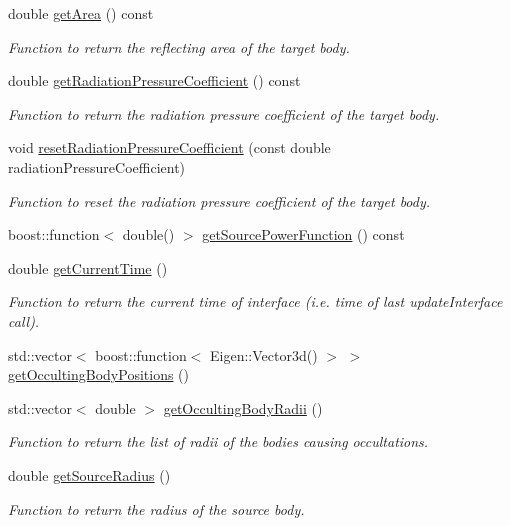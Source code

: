 \begin{DoxyCompactItemize}
double \hyperlink{classtudat_1_1electro__magnetism_1_1RadiationPressureInterface_a5325694fd8405b5645cfe418f6f405ab}{get\+Area} () const 
\begin{DoxyCompactList}\small\item\em Function to return the reflecting area of the target body. \end{DoxyCompactList}\item 
double \hyperlink{classtudat_1_1electro__magnetism_1_1RadiationPressureInterface_aa842d443f73b0af16be5e0642ec4fa57}{get\+Radiation\+Pressure\+Coefficient} () const 
\begin{DoxyCompactList}\small\item\em Function to return the radiation pressure coefficient of the target body. \end{DoxyCompactList}\item 
void \hyperlink{classtudat_1_1electro__magnetism_1_1RadiationPressureInterface_a8677c222996dd15c80037739d643731c}{reset\+Radiation\+Pressure\+Coefficient} (const double radiation\+Pressure\+Coefficient)
\begin{DoxyCompactList}\small\item\em Function to reset the radiation pressure coefficient of the target body. \end{DoxyCompactList}\item 
boost\+::function$<$ double() $>$ \hyperlink{classtudat_1_1electro__magnetism_1_1RadiationPressureInterface_a1439814afc2c6d8fbf43f46a4dc021f7}{get\+Source\+Power\+Function} () const 
\item 
double \hyperlink{classtudat_1_1electro__magnetism_1_1RadiationPressureInterface_a7fd4c43372b7add206e54044e18a5d35}{get\+Current\+Time} ()
\begin{DoxyCompactList}\small\item\em Function to return the current time of interface (i.\+e. time of last update\+Interface call). \end{DoxyCompactList}\item 
std\+::vector$<$ boost\+::function$<$ Eigen\+::\+Vector3d() $>$ $>$ \hyperlink{classtudat_1_1electro__magnetism_1_1RadiationPressureInterface_ae3c8e131751ec18ca2dd6cdff0ae0898}{get\+Occulting\+Body\+Positions} ()
\item 
std\+::vector$<$ double $>$ \hyperlink{classtudat_1_1electro__magnetism_1_1RadiationPressureInterface_a3417a71782baee1f6868bceea6664c74}{get\+Occulting\+Body\+Radii} ()
\begin{DoxyCompactList}\small\item\em Function to return the list of radii of the bodies causing occultations. \end{DoxyCompactList}\item 
double \hyperlink{classtudat_1_1electro__magnetism_1_1RadiationPressureInterface_ac6ad709c6a0ccb789407e1f4297ba392}{get\+Source\+Radius} ()
\begin{DoxyCompactList}\small\item\em Function to return the radius of the source body. \end{DoxyCompactList}\end{DoxyCompactItemize}
